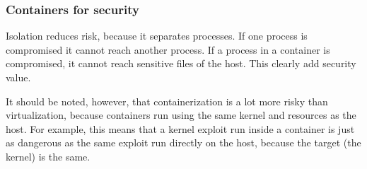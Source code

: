 \subsubsection{Containers for security}

Isolation reduces risk, because it separates processes. If one process is compromised it cannot reach another process. If a process in a container is compromised, it cannot reach sensitive files of the host. This clearly add security value.

\hfill

It should be noted, however, that containerization is a lot more risky than virtualization, because containers run using the same kernel and resources as the host. For example, this means that a kernel exploit run inside a container is just as dangerous as the same exploit run directly on the host, because the target (the kernel) is the same.
